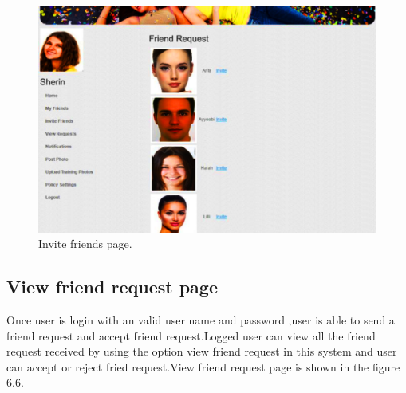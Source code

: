  \begin{figure}[H]
\begin{minipage}[c]{1\linewidth}
\begin{center}
 \includegraphics[width=\textwidth]{sherininvitefriends.png}
            \caption[Invite Friends Page]{Invite friends page.}
             \label{Invite friends}
\end{center}
\end{minipage}
\end{figure}
\clearpage
 \subsection[View Friend Request Page]{View friend request page}
\noindent
 Once user is login with an valid user name and password ,user is able to send a friend request and accept friend request.Logged user can view all  the friend request received by using the option view friend request in this system and user can accept or reject fried request.View friend request page is shown in the figure 6.6.
\vspace{1cm} 
\vspace{1cm}
\vspace{1cm}
 
